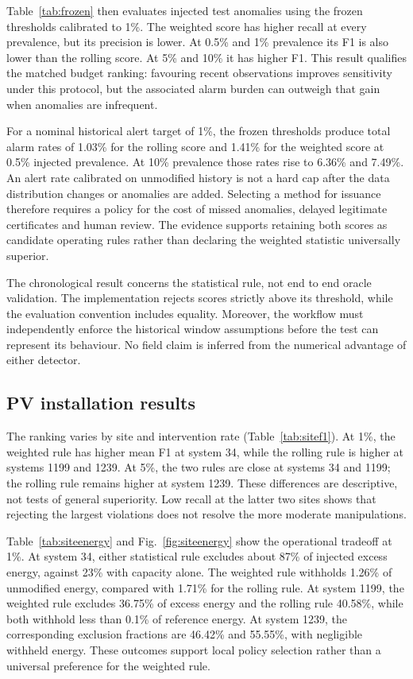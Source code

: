 \documentclass[11pt,a4paper]{article}
\begin{document}
Table~\ref{tab:frozen} then evaluates injected test anomalies using the frozen thresholds calibrated to 1\%. The weighted score has higher recall at every prevalence, but its precision is lower. At 0.5\% and 1\% prevalence its F1 is also lower than the rolling score. At 5\% and 10\% it has higher F1. This result qualifies the matched budget ranking: favouring recent observations improves sensitivity under this protocol, but the associated alarm burden can outweigh that gain when anomalies are infrequent.



For a nominal historical alert target of 1\%, the frozen thresholds produce total alarm rates of 1.03\% for the rolling score and 1.41\% for the weighted score at 0.5\% injected prevalence. At 10\% prevalence those rates rise to 6.36\% and 7.49\%. An alert rate calibrated on unmodified history is not a hard cap after the data distribution changes or anomalies are added. Selecting a method for issuance therefore requires a policy for the cost of missed anomalies, delayed legitimate certificates and human review. The evidence supports retaining both scores as candidate operating rules rather than declaring the weighted statistic universally superior.

The chronological result concerns the statistical rule, not end to end oracle validation. The implementation rejects scores strictly above its threshold, while the evaluation convention includes equality. Moreover, the workflow must independently enforce the historical window assumptions before the test can represent its behaviour. No field claim is inferred from the numerical advantage of either detector.

\subsection{PV installation results}

The ranking varies by site and intervention rate (Table~\ref{tab:sitef1}). At 1\%, the weighted rule has higher mean F1 at system 34, while the rolling rule is higher at systems 1199 and 1239. At 5\%, the two rules are close at systems 34 and 1199; the rolling rule remains higher at system 1239. These differences are descriptive, not tests of general superiority. Low recall at the latter two sites shows that rejecting the largest violations does not resolve the more moderate manipulations.


Table~\ref{tab:siteenergy} and Fig.~\ref{fig:siteenergy} show the operational tradeoff at 1\%. At system 34, either statistical rule excludes about 87\% of injected excess energy, against 23\% with capacity alone. The weighted rule withholds 1.26\% of unmodified energy, compared with 1.71\% for the rolling rule. At system 1199, the weighted rule excludes 36.75\% of excess energy and the rolling rule 40.58\%, while both withhold less than 0.1\% of reference energy. At system 1239, the corresponding exclusion fractions are 46.42\% and 55.55\%, with negligible withheld energy. These outcomes support local policy selection rather than a universal preference for the weighted rule.
\end{document}
